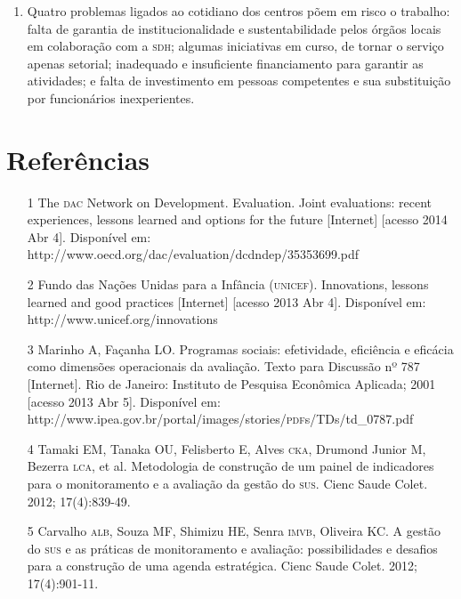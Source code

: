 \documentclass{article}
\begin{document}
\begin{enumerate}
\item
Quatro problemas ligados ao cotidiano dos centros põem em risco o trabalho:
falta de garantia de institucionalidade e sustentabilidade pelos órgãos locais
em colaboração com a \textsc{sdh}; algumas iniciativas em curso, de tornar o serviço
apenas setorial; inadequado e insuficiente financiamento para garantir as
atividades; e falta de investimento em pessoas competentes e sua substituição
por funcionários inexperientes.

\end{enumerate}

\section*{Referências}
\begin{itemize}

\item[1] The \textsc{dac} Network on Development. Evaluation. Joint evaluations: recent
experiences, lessons learned and options for the future [Internet] [acesso 2014
Abr 4]. Disponível em: http://www.oecd.org/dac/evaluation/dcdndep/35353699.pdf

\item[2] Fundo das Nações Unidas para a Infância (\textsc{unicef}). Innovations, lessons
learned and good practices [Internet] [acesso 2013 Abr 4]. Disponível em:
http://www.unicef.org/innovations

\item[3] Marinho A, Façanha LO. Programas sociais: efetividade, eficiência e
eficácia como dimensões operacionais da avaliação. Texto para Discussão nº 787
[Internet]. Rio de Janeiro: Instituto de Pesquisa Econômica Aplicada; 2001
[acesso 2013 Abr 5]. Disponível em:
http://www.ipea.gov.br/portal/images/stories/\textsc{pdf}s/TDs/td\_{}0787.pdf

\item[4] Tamaki EM, Tanaka OU, Felisberto E, Alves \textsc{cka}, Drumond Junior M,
Bezerra \textsc{lca}, et al. Metodologia de construção de um painel de indicadores para o
monitoramento e a avaliação da gestão do \textsc{sus}. Cienc Saude Colet. 2012;
17(4):839-49.

\item[5] Carvalho \textsc{alb}, Souza MF, Shimizu HE, Senra \textsc{imvb}, Oliveira KC. A gestão
do \textsc{sus} e as práticas de monitoramento e avaliação: possibilidades e desafios
para a construção de uma agenda estratégica. Cienc Saude Colet. 2012;
17(4):901-11.


\end{itemize}
\end{document}
